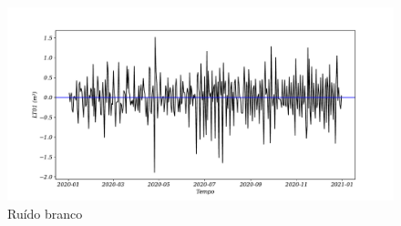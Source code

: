 \begin{figure}[H]
	\centering
	\caption{Ruído branco}
	\label{fig:ruido-branco}
	\includegraphics[width=0.9\linewidth]{Resultados/Figuras/ruido-branco}
	

\end{figure}
